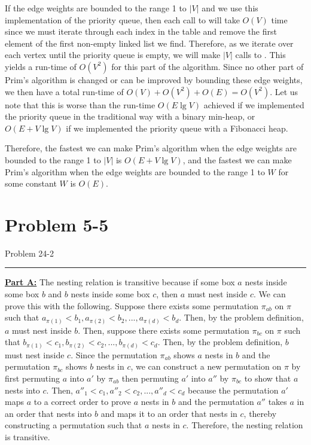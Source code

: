 \documentclass[11pt]{article}
\def\separateline{\medskip\hrule\medskip}
\begin{document}
If the edge weights are bounded to the range 1 to $|V|$ and we use this implementation of the priority queue, then each call to  will take $O(V)$ time since we must iterate through each index in the table and remove the first element of the first non-empty linked list we find. Therefore, as we iterate over each vertex until the priority queue is empty, we will make $|V|$ calls to . This yields a run-time of $O(V^2)$ for this part of the algorithm. Since no other part of Prim's algorithm is changed or can be improved by bounding these edge weights, we then have a total run-time of $O(V) + O(V^2) + O(E) = O(V^2)$. Let us note that this is worse than the run-time $O(E\lg{V})$ achieved if we implemented the priority queue in the traditional way with a binary min-heap, or $O(E + V\lg{V})$ if we implemented the priority queue with a Fibonacci heap.

Therefore, the fastest we can make Prim's algorithm when the edge weights are bounded to the range 1 to $|V|$ is $O(E + V\lg{V})$, and the fastest we can make Prim's algorithm when the edge weights are bounded to the range 1 to $W$ for some constant $W$ is $O(E)$.

\newpage

\section{Problem 5-5}
Problem 24-2
\separateline

\textbf{\underline{Part A:}} The nesting relation is transitive because if some box $a$ nests inside some box $b$ and $b$ nests inside some box $c$, then $a$ must nest inside $c$. We can prove this with the following. Suppose there exists some permutation $\pi_{ab}$ on $\pi$ such that $a_{\pi(1)} < b_1, a_{\pi(2)} < b_2, ..., a_{\pi(d)} < b_d$. Then, by the problem definition, $a$ must nest inside $b$. Then, suppose there exists some permutation $\pi_{bc}$ on $\pi$ such that $b_{\pi(1)} < c_1, b_{\pi(2)} < c_2, ..., b_{\pi(d)} < c_d$. Then, by the problem definition, $b$ must nest inside $c$. Since the permutation $\pi_{ab}$ shows $a$ nests in $b$ and the permutation $\pi_{bc}$ shows $b$ nests in $c$, we can construct a new permutation on $\pi$ by first permuting $a$ into $a'$ by $\pi_{ab}$ then permuting $a'$ into $a''$ by $\pi_{bc}$ to show that $a$ nests into $c$. Then, $a''_1 < c_1, a''_2 < c_2, ..., a''_d < c_d$ because the permutation $a'$ maps $a$ to a correct order to prove $a$ nests in $b$ and the permutation $a''$ takes $a$ in an order that nests into $b$ and maps it to an order that nests in $c$, thereby constructing a permutation such that $a$ nests in $c$. Therefore, the nesting relation is transitive.\\
\end{document}

